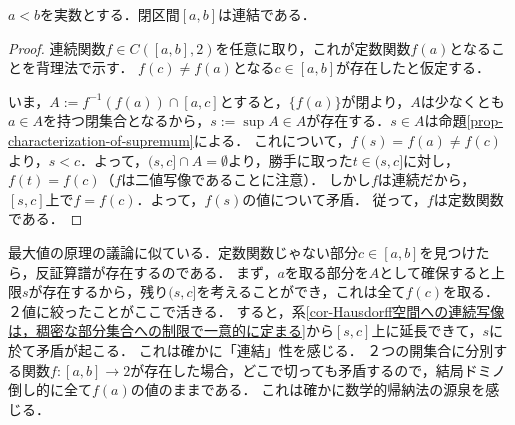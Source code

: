 \documentclass[uplatex,dvipdfmx]{jsreport}
\begin{document}
\begin{proposition}\label{prop-closed-interval-is-connected}
    $a<b$を実数とする．閉区間$[a,b]$は連結である．
\end{proposition}
\begin{proof}
    連続関数$f\in C([a,b],2)$を任意に取り，これが定数関数$f(a)$となることを背理法で示す．
    $f(c)\ne f(a)$となる$c\in[a,b]$が存在したと仮定する．

    いま，$A:=f^{-1}(f(a))\cap[a,c]$とすると，$\{f(a)\}$が閉より，$A$は少なくとも$a\in A$を持つ閉集合となるから，$s:=\sup A\in A$が存在する．$s\in A$は命題\ref{prop-characterization-of-supremum}による．
    これについて，$f(s)=f(a)\ne f(c)$より，$s<c$．よって，$(s,c]\cap A=\emptyset$より，勝手に取った$t\in(s,c]$に対し，$f(t)=f(c)$（$f$は二値写像であることに注意）．
    しかし$f$は連続だから，$[s,c]$上で$f=f(c)$．よって，$f(s)$の値について矛盾．
    従って，$f$は定数関数である．
\end{proof}
\begin{remarks}
    最大値の原理の議論に似ている．定数関数じゃない部分$c\in[a,b]$を見つけたら，反証算譜が存在するのである．
    まず，$a$を取る部分を$A$として確保すると上限$s$が存在するから，残り$(s,c]$を考えることができ，これは全て$f(c)$を取る．２値に絞ったことがここで活きる．
    すると，系\ref{cor-Hausdorff空間への連続写像は，稠密な部分集合への制限で一意的に定まる}から$[s,c]$上に延長できて，$s$に於て矛盾が起こる．
    これは確かに「連結」性を感じる．
    ２つの開集合に分別する関数$f:[a,b]\to 2$が存在した場合，どこで切っても矛盾するので，結局ドミノ倒し的に全て$f(a)$の値のままである．
    これは確かに数学的帰納法の源泉を感じる．
\end{remarks}
\end{document}
